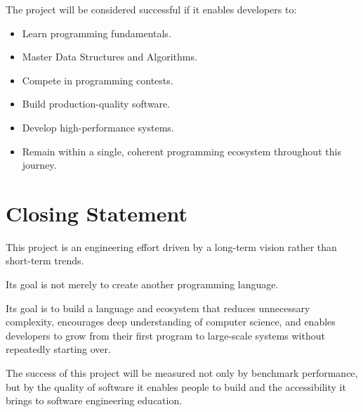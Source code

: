 \documentclass[12pt]{article}
\begin{document}
The project will be considered successful if it enables developers to:

\begin{itemize}
    \item Learn programming fundamentals.
    \item Master Data Structures and Algorithms.
    \item Compete in programming contests.
    \item Build production-quality software.
    \item Develop high-performance systems.
    \item Remain within a single, coherent programming ecosystem throughout this journey.
\end{itemize}


\section{Closing Statement}

This project is an engineering effort driven by a long-term vision rather than short-term trends.

Its goal is not merely to create another programming language.

Its goal is to build a language and ecosystem that reduces unnecessary complexity, encourages deep understanding of computer science, and enables developers to grow from their first program to large-scale systems without repeatedly starting over.

The success of this project will be measured not only by benchmark performance, but by the quality of software it enables people to build and the accessibility it brings to software engineering education.
\end{document}
